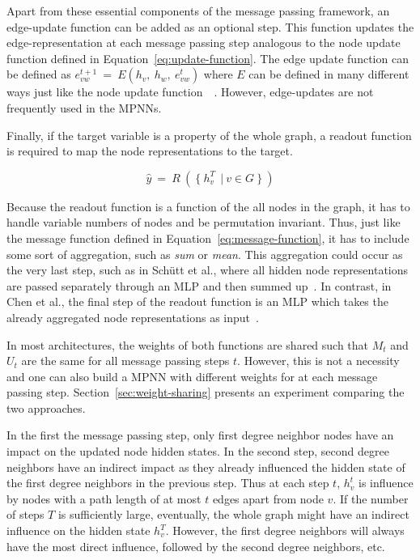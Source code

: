 Apart from these essential components of the message passing framework, an edge-update function can be added as an optional step. This function updates the edge-representation at each message passing step analogous to the node update function defined in Equation~\ref{eq:update-function}. The edge update function can be defined as $e_{vw}^{t+1} ~=~ E(h_v,~ h_w,~ e_{vw}^{t})$ where $E$ can be defined in many different ways just like the node update function~\cite{Kearnes2016}~\cite{Jørgensen2018}. However, edge-updates are not frequently used in the MPNNs.

Finally, if the target variable is a property of the whole graph, a readout function is required to map the node representations to the target.

\begin{equation}\label{eq:readout-function}
	\hat{y} ~=~ R~(~\{~h_v^T\ ~|~ v \in G~\}~)
\end{equation}


Because the readout function is a function of the all nodes in the graph, it has to handle variable numbers of nodes and be permutation invariant. Thus, just like the message function defined in Equation~\ref{eq:message-function}, it has to include some sort of aggregation, such as \textit{sum} or \textit{mean}. This aggregation could occur as the very last step, such as in Schütt et al., where all hidden node representations are passed separately through an MLP and then summed up~\cite{Schutt2017}. In contrast, in Chen et al., the final step of the readout function is an MLP which takes the already aggregated node representations as input~\cite{Chen2019}.

In most architectures, the weights of both functions are shared such that $M_t$ and $U_t$ are the same for all message passing steps $t$. However, this is not a necessity and one can also build a MPNN with different weights for at each message passing step. Section~\ref{sec:weight-sharing} presents an experiment comparing the two approaches.

In the first the message passing step, only first degree neighbor nodes have an impact on the updated node hidden states. In the second step, second degree neighbors have an indirect impact as they already influenced the hidden state of the first degree neighbors in the previous step. Thus at each step $t$, $h_v^t$ is influence by nodes with a path length of at most $t$ edges apart from node $v$. If the number of steps $T$ is sufficiently large, eventually, the whole graph might have an indirect influence on the hidden state $h_v^T$. However, the first degree neighbors will always have the most direct influence, followed by the second degree neighbors, etc.

